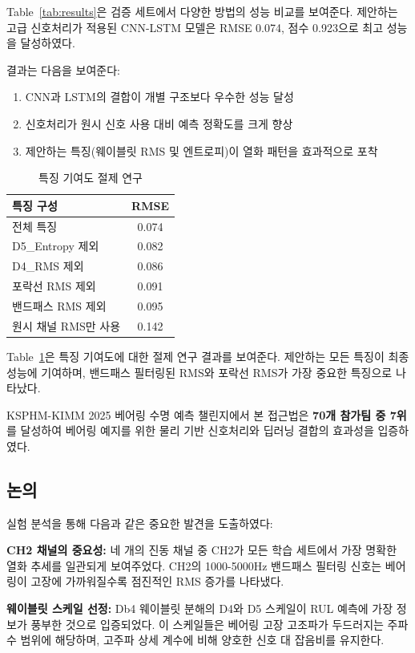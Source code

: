 \documentclass[conference,twocolumn]{IEEEtran}
\begin{document}
Table~\ref{tab:results}은 검증 세트에서 다양한 방법의 성능 비교를 보여준다. 제안하는 고급 신호처리가 적용된 CNN-LSTM 모델은 RMSE 0.074, 점수 0.923으로 최고 성능을 달성하였다.

결과는 다음을 보여준다:
\begin{enumerate}
    \item CNN과 LSTM의 결합이 개별 구조보다 우수한 성능 달성
    \item 신호처리가 원시 신호 사용 대비 예측 정확도를 크게 향상
    \item 제안하는 특징(웨이블릿 RMS 및 엔트로피)이 열화 패턴을 효과적으로 포착
\end{enumerate}

\begin{table}[t]
\centering
\caption{특징 기여도 절제 연구}
\label{tab:ablation}
\begin{tabular}{lc}
\toprule
\textbf{특징 구성} & \textbf{RMSE} \\
\midrule
전체 특징 & 0.074 \\
D5\_Entropy 제외 & 0.082 \\
D4\_RMS 제외 & 0.086 \\
포락선 RMS 제외 & 0.091 \\
밴드패스 RMS 제외 & 0.095 \\
원시 채널 RMS만 사용 & 0.142 \\
\bottomrule
\end{tabular}
\end{table}

Table~\ref{tab:ablation}은 특징 기여도에 대한 절제 연구 결과를 보여준다. 제안하는 모든 특징이 최종 성능에 기여하며, 밴드패스 필터링된 RMS와 포락선 RMS가 가장 중요한 특징으로 나타났다.

KSPHM-KIMM 2025 베어링 수명 예측 챌린지에서 본 접근법은 \textbf{70개 참가팀 중 7위}를 달성하여 베어링 예지를 위한 물리 기반 신호처리와 딥러닝 결합의 효과성을 입증하였다.

\subsection{논의}

실험 분석을 통해 다음과 같은 중요한 발견을 도출하였다:

\textbf{CH2 채널의 중요성:} 네 개의 진동 채널 중 CH2가 모든 학습 세트에서 가장 명확한 열화 추세를 일관되게 보여주었다. CH2의 1000-5000Hz 밴드패스 필터링 신호는 베어링이 고장에 가까워질수록 점진적인 RMS 증가를 나타냈다.

\textbf{웨이블릿 스케일 선정:} Db4 웨이블릿 분해의 D4와 D5 스케일이 RUL 예측에 가장 정보가 풍부한 것으로 입증되었다. 이 스케일들은 베어링 고장 고조파가 두드러지는 주파수 범위에 해당하며, 고주파 상세 계수에 비해 양호한 신호 대 잡음비를 유지한다.
\end{document}
